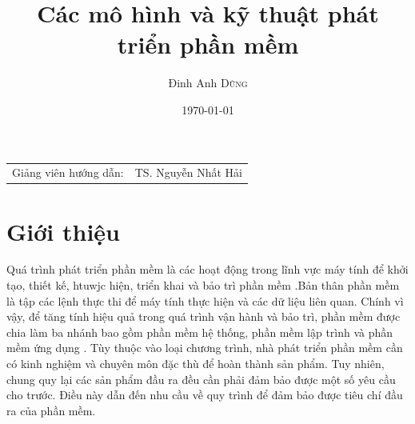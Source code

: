 \documentclass{article}
\title{Các mô hình và kỹ thuật phát triển phần mềm} %
\author{Đinh Anh \textsc{Dũng}} %
\date{\today} %
\begin{document}
\maketitle %

\begin{center}
\begin{tabular}{l r}
Giảng viên hướng dẫn: & TS. Nguyễn Nhất Hải %
\end{tabular}
\end{center}



\section{Giới thiệu}

Quá trình phát triển phần mềm là các hoạt động trong lĩnh vực máy tính để khởi tạo, thiết kế, htuwjc hiện, triển khai và bảo trì phần mềm \cite{ibm}.Bản thân phần mềm là tập các lệnh thực thi để máy tính thực hiện và các dữ liệu liên quan. Chính vì vậy, để tăng tính hiệu quả trong quá trình vận hành và bảo trì, phần mềm được chia làm ba nhánh bao gồm phần mềm hệ thống, phần mềm lập trình và phần mềm ứng dụng \cite{ibm}. Tùy thuộc vào loại chương trình, nhà phát triển phần mềm cần có kinh nghiệm và chuyên môn đặc thù để hoàn thành sản phẩm. Tuy nhiên, chung quy lại các sản phẩm đầu ra đều cần phải đảm bảo được một số yêu cầu cho trước. Điều này dẫn đến nhu cầu về quy trình để đảm bảo được tiêu chí đầu ra của phần mềm.
\end{document}
